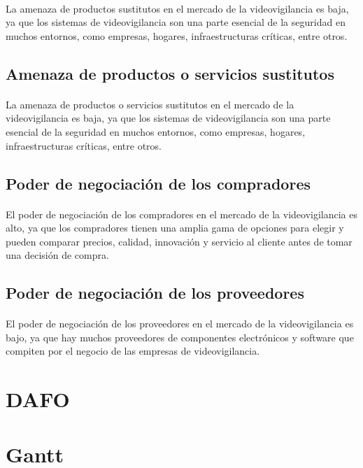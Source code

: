 \documentclass{report}
\begin{document}
          \paragraph*{}{La amenaza de productos sustitutos en el mercado de la videovigilancia es baja, ya que los sistemas de videovigilancia son una parte esencial de la seguridad en muchos entornos, como empresas, hogares, infraestructuras críticas, entre otros.}
        \subsection*{Amenaza de productos o servicios sustitutos}
          \paragraph*{}{La amenaza de productos o servicios sustitutos en el mercado de la videovigilancia es baja, ya que los sistemas de videovigilancia son una parte esencial de la seguridad en muchos entornos, como empresas, hogares, infraestructuras críticas, entre otros.}
        \subsection*{Poder de negociación de los compradores}
          \paragraph*{}{El poder de negociación de los compradores en el mercado de la videovigilancia es alto, ya que los compradores tienen una amplia gama de opciones para elegir y pueden comparar precios, calidad, innovación y servicio al cliente antes de tomar una decisión de compra.}
        \subsection*{Poder de negociación de los proveedores}
          \paragraph*{}{El poder de negociación de los proveedores en el mercado de la videovigilancia es bajo, ya que hay muchos proveedores de componentes electrónicos y software que compiten por el negocio de las empresas de videovigilancia.}
      \clearpage\section{DAFO}
      \clearpage\section{Gantt}
\end{document}
